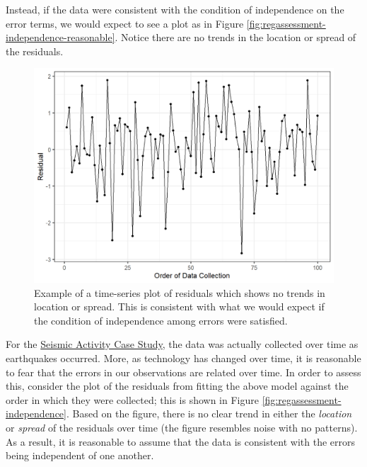 \documentclass[
]{book}
\theoremstyle{plain}
\theoremstyle{mydefn}
\theoremstyle{myexmpl}
\theoremstyle{remark}
\begin{document}
Instead, if the data were consistent with the condition of independence on the error terms, we would expect to see a plot as in Figure \ref{fig:regassessment-independence-reasonable}. Notice there are no trends in the location or spread of the residuals.

\begin{figure}

{\centering \includegraphics[width=0.8\linewidth]{./Images/anovaassessment-independence-reasonable-1} 

}

\caption{Example of a time-series plot of residuals which shows no trends in location or spread.  This is consistent with what we would expect if the condition of independence among errors were satisfied.}\label{fig:anovaassessment-independence-reasonable}
\end{figure}

For the \protect\hyperlink{CaseGreece}{Seismic Activity Case Study}, the data was actually collected over time as earthquakes occurred. More, as technology has changed over time, it is reasonable to fear that the errors in our observations are related over time. In order to assess this, consider the plot of the residuals from fitting the above model against the order in which they were collected; this is shown in Figure \ref{fig:regassessment-independence}. Based on the figure, there is no clear trend in either the \emph{location} or \emph{spread} of the residuals over time (the figure resembles noise with no patterns). As a result, it is reasonable to assume that the data is consistent with the errors being independent of one another.
\end{document}
